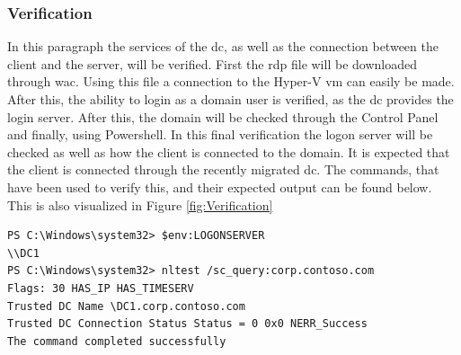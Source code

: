 \subsubsection{Verification}
In this paragraph the services of the \acrshort{dc}, as well as the connection between the client and the server, will be verified. First the \acrfull{rdp} file will be downloaded through \acrlong{wac}. Using this file a connection to the Hyper-V \acrshort{vm} can easily be made. After this, the ability to login as a domain user is verified, as the \acrshort{dc} provides the login server. After this, the domain will be checked through the Control Panel and finally, using Powershell. In this final verification the logon server will be checked as well as how the client is connected to the domain. It is expected that the client is connected through the recently migrated \acrshort{dc}.
The commands, that have been used to verify this, and their expected output can be found below. This is also visualized in Figure \ref{fig:Verification}
\begin{lstlisting}[breaklines]
PS C:\Windows\system32> $env:LOGONSERVER
\\DC1
PS C:\Windows\system32> nltest /sc_query:corp.contoso.com
Flags: 30 HAS_IP HAS_TIMESERV
Trusted DC Name \DC1.corp.contoso.com
Trusted DC Connection Status Status = 0 0x0 NERR_Success
The command completed successfully
\end{lstlisting}

